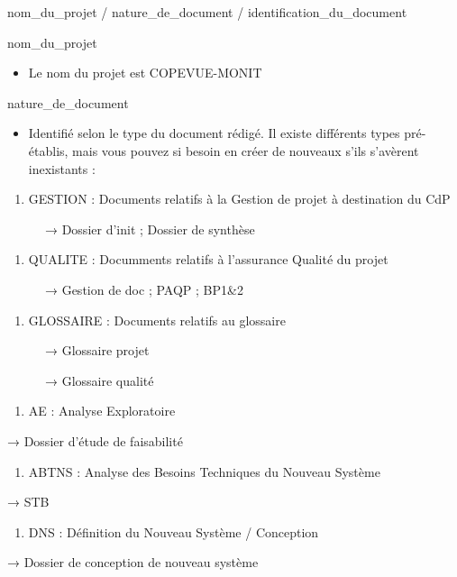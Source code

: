 \documentclass{article}
\begin{document}
\bigskip

nom\_du\_projet / nature\_de\_document / identification\_du\_document


\bigskip

nom\_du\_projet

\begin{itemize}
\item Le nom du projet est COPEVUE-MONIT
\end{itemize}

\bigskip

nature\_de\_document

\begin{itemize}
\item Identifié selon le type du document rédigé. Il existe différents
types pré-établis, mais vous pouvez si besoin en créer de nouveaux
s’ils s’avèrent inexistants :
\end{itemize}
\begin{enumerate}
\item GESTION : Documents relatifs à la Gestion de projet à destination
du CdP
\end{enumerate}
\ \ \ \ \ \ → Dossier d’init ; Dossier de synthèse

\begin{enumerate}
\item QUALITE : Documments relatifs à l’assurance Qualité du projet
\end{enumerate}
\ \ \ \ \ \ → Gestion de doc ; PAQP ; BP1\&2

\begin{enumerate}
\item GLOSSAIRE : Documents relatifs au glossaire
\end{enumerate}
\ \ \ \ \ \ → Glossaire projet

\ \ \ \ \ \ → Glossaire qualité

\begin{enumerate}
\item AE : Analyse Exploratoire
\end{enumerate}
→ Dossier d’étude de faisabilité

\begin{enumerate}
\item ABTNS : Analyse des Besoins Techniques du Nouveau Système
\end{enumerate}
→ STB

\begin{enumerate}
\item DNS : Définition du Nouveau Système / Conception
\end{enumerate}
→ Dossier de conception de nouveau système
\end{document}
